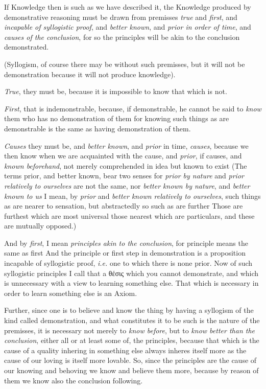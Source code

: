 If Knowledge then is such as we have described it, the Knowledge produced by
demonstrative reasoning must be drawn from premisses \emph{true} and
\emph{first}, and \emph{incapable of syllogistic proof}, and \emph{better
known}, and \emph{prior in order of time}, and \emph{causes of the
conclusion}, for so the principles will be akin to the conclusion
demonstrated.

(Syllogism, of course there may be without such premisses, but it will not be
demonstration because it will not produce knowledge).

\emph{True}, they must be, because it is impossible to know that which is not.

\emph{First}, that is indemonstrable, because, if demonstrable, he cannot be
said to \emph{know} them who has no demonstration of them for knowing such
things as are demonstrable is the same as having demonstration of them.

\emph{Causes} they must be, and \emph{better known}, and \emph{prior} in time,
\emph{causes}, because we then know when we are acquainted with the cause, and
\emph{prior}, if causes, and \emph{known beforehand}, not merely comprehended
in idea but known to exist (The terms prior, and better known, bear two senses
for \emph{prior by nature} and \emph{prior relatively to ourselves} are not the
same, nor \emph{better known by nature}, and \emph{better known to us} I mean,
by \emph{prior} and \emph{better known relatively to ourselves}, such things as
are nearer to sensation, but abstractedly so such as are further Those are
furthest which are most universal those nearest which are particulars, and
these are mutually opposed.)

And by \emph{first}, I mean \emph{principles akin to the conclusion}, for
principle means the same as first And the principle or first step in
demonstration is a proposition incapable of syllogistic proof, \emph{i.e.} one
to which there is none prior. Now of such syllogistic principles I call that a
θέσις which you cannot demonstrate, and which is
unnecessary with a view to learning something else. That which is necessary in
order to learn something else is an Axiom.

Further, since one is to believe and know the thing by having a syllogism of
the kind called demonstration, and what constitutes it to be such is the nature
of the premisses, it is necessary not merely to \emph{know before}, but to
\emph{know better than the conclusion}, either all or at least some of, the
principles, because that which is the cause of a quality inhering in something
else always inheres itself more as the cause of our loving is itself more
lovable. So, since the principles are the cause of our knowing and behoving we
know and believe them more, because by reason of them we know also the
conclusion following.

